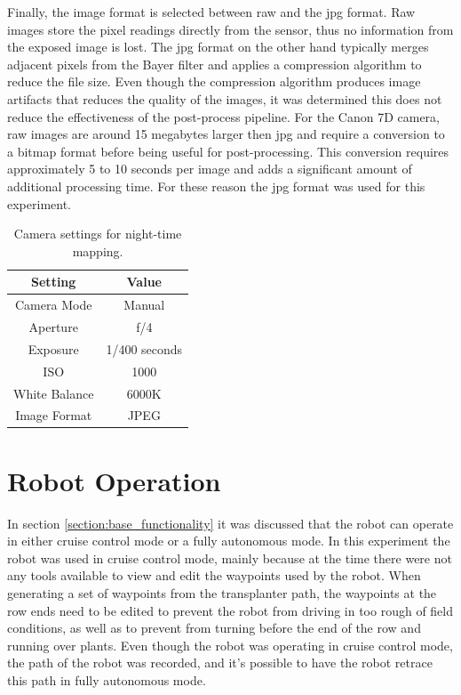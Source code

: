 Finally, the image format is selected between raw and the \ac{jpg} format.  Raw images store the pixel readings directly from the sensor, thus no information from the exposed image is lost.  The \ac{jpg} format on the other hand typically merges adjacent pixels from the Bayer filter and applies a compression algorithm to reduce the file size.  Even though the compression algorithm produces image artifacts that reduces the quality of the images, it was determined this does not reduce the effectiveness of the post-process pipeline.  For the Canon 7D camera, raw images are around 15 megabytes larger then \ac{jpg} and require a conversion to a bitmap format before being useful for post-processing.  This conversion requires approximately 5 to 10 seconds per image and adds a significant amount of additional processing time.  For these reason the \ac{jpg} format was used for this experiment.

\begin{table}
    \begin{center}
    \caption[Camera settings]{Camera settings for night-time mapping.}
    \begin{tabular}[c]{|c|c|}
        \hline
        Setting & Value \\
        \hline
        Camera Mode     & Manual        \\
        Aperture & f/4          \\
        Exposure & 1/400 seconds   \\
        ISO      & 1000  \\
        White Balance & 6000K \\
        Image Format & JPEG \\
        \hline
    \end{tabular}
    \label{table:camera_settings}
   \end{center}
\end{table}


\section{Robot Operation}

In section \ref{section:base_functionality} it was discussed that the robot can operate in either cruise control mode or a fully autonomous mode.  In this experiment the robot was used in cruise control mode, mainly because at the time there were not any tools available to view and edit the waypoints used by the robot.  When generating a set of waypoints from the transplanter path, the waypoints at the row ends need to be edited to prevent the robot from driving in too rough of field conditions, as well as to prevent from turning before the end of the row and running over plants.  Even though the robot was operating in cruise control mode, the path of the robot was recorded, and it's possible to have the robot retrace this path in fully autonomous mode.
